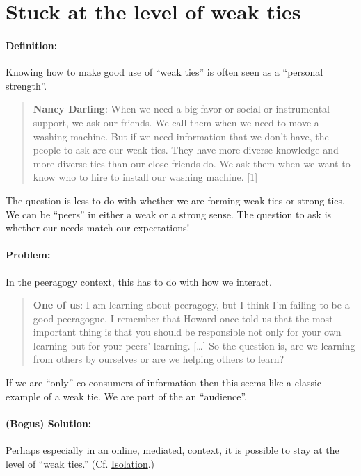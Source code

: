 \section{Stuck at the level of weak ties}
\paragraph{Definition:} Knowing how to make good use of ``weak ties'' is
often seen as a ``personal strength''.

\begin{quote}
\textbf{Nancy Darling}:  When we need a big favor or social or
instrumental support, we ask our friends. We call them when we need to
move a washing machine. But if we need information that we don't have,
the people to ask are our weak ties. They have more diverse knowledge
and more diverse ties than our close friends do. We ask them when we
want to know who to hire to install our washing machine. {[}1{]}
\end{quote}

The question is less to do with whether we are forming weak ties or
strong ties. We can be ``peers'' in either a weak or a strong sense. The
question to ask is whether our needs match our expectations!

\paragraph{Problem:} In the peeragogy context, this has to do with how we
interact.

\begin{quote}
\textbf{One of us}: I am learning about peeragogy, but I think I'm
failing to be a good peeragogue. I remember that Howard once told us
that the most important thing is that you should be responsible not only
for your own learning but for your peers' learning. {[}\ldots{}{]} So
the question is, are we learning from others by ourselves or are we
helping others to learn?
\end{quote}

If we are ``only'' co-consumers of information then this seems like a
classic example of a weak tie. We are part of the an ``audience''.

\paragraph{(Bogus) Solution:} Perhaps especially in an online, mediated, context,
it is possible to stay at the level of ``weak ties.''
(Cf. \href{http://peeragogy.org/antipatterns/isolation/}{Isolation}.)

